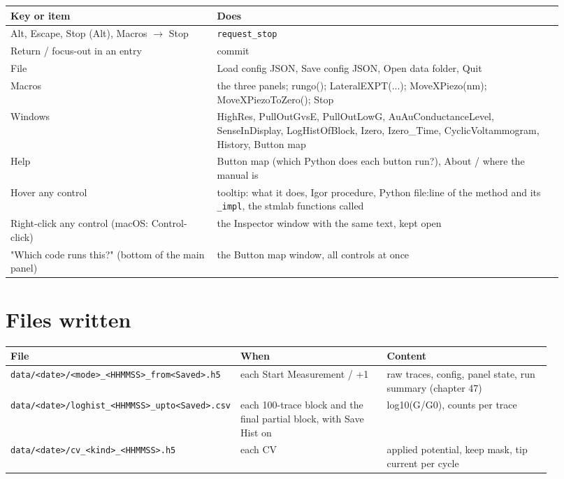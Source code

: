 \small\setlength{\LTleft}{0pt}\setlength{\LTright}{\fill}
\begin{longtable}{@{}>{\raggedright\arraybackslash}p{0.34\linewidth}>{\raggedright\arraybackslash}p{0.58\linewidth}@{}}
\toprule
\textbf{Key or item} & \textbf{Does} \\
\midrule\endhead
Alt, Escape, Stop (Alt), Macros $\rightarrow$ Stop & \texttt{request\_\discretionary{}{}{}stop} \\
Return / focus-out in an entry & commit \\
File & Load config JSON, Save config JSON, Open data folder, Quit \\
Macros & the three panels; rungo(); LateralEXPT(...); MoveXPiezo(nm); MoveXPiezoToZero(); Stop \\
Windows & HighRes, PullOutGvsE, PullOutLowG, AuAuConductanceLevel, SenseInDisplay, LogHistOfBlock, Izero, Izero\_Time, CyclicVoltammogram, History, Button map \\
Help & Button map (which Python does each button run?), About / where the manual is \\
Hover any control & tooltip: what it does, Igor procedure, Python file:line of the method and its \texttt{\_\discretionary{}{}{}impl}, the stmlab functions called \\
Right-click any control (macOS: Control-click) & the Inspector window with the same text, kept open \\
"Which code runs this?" (bottom of the main panel) & the Button map window, all controls at once \\
\bottomrule
\end{longtable}
\normalsize

\section{Files written}

\small\setlength{\LTleft}{0pt}\setlength{\LTright}{\fill}
\begin{longtable}{@{}>{\raggedright\arraybackslash}p{0.26\linewidth}>{\raggedright\arraybackslash}p{0.30\linewidth}>{\raggedright\arraybackslash}p{0.34\linewidth}@{}}
\toprule
\textbf{File} & \textbf{When} & \textbf{Content} \\
\midrule\endhead
\texttt{data/\discretionary{}{}{}<date>/\discretionary{}{}{}<mode>\_\discretionary{}{}{}<HHMMSS>\_\discretionary{}{}{}from<Saved>.\discretionary{}{}{}h5} & each Start Measurement / +1 & raw traces, config, panel state, run summary (chapter 47) \\
\texttt{data/\discretionary{}{}{}<date>/\discretionary{}{}{}loghist\_\discretionary{}{}{}<HHMMSS>\_\discretionary{}{}{}upto<Saved>.\discretionary{}{}{}csv} & each 100-trace block and the final partial block, with Save Hist on & log10(G/G0), counts per trace \\
\texttt{data/\discretionary{}{}{}<date>/\discretionary{}{}{}cv\_\discretionary{}{}{}<kind>\_\discretionary{}{}{}<HHMMSS>.\discretionary{}{}{}h5} & each CV & applied potential, keep mask, tip current per cycle \\
\bottomrule
\end{longtable}
\normalsize

